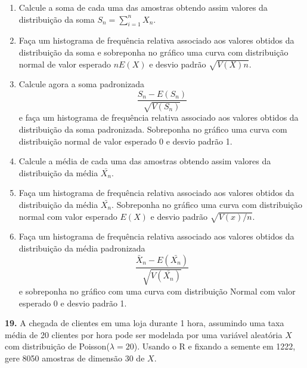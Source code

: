 \documentclass[
]{book}
\begin{document}
\begin{enumerate}
\def\labelenumi{(\alph{enumi})}
\item
  Calcule a soma de cada uma das amostras obtendo assim valores da
  distribuição da soma \(S_{n} = \sum_{i=1}^{n}X_{n}\).
\item
  Faça um histograma de frequência relativa associado aos valores
  obtidos da distribuição da soma e sobreponha no gráfico uma curva com
  distribuição normal de valor esperado \(nE(X)\) e desvio padrão
  \(\sqrt{V(X)n}\).
\item
  Calcule agora a soma padronizada
  \[\frac{S_{n}-E(S_{n})}{\sqrt{V(S_{n})}}\] e faça um histograma de
  frequência relativa associado aos valores obtidos da distribuição da
  soma padronizada. Sobreponha no gráfico uma curva com distribuição
  normal de valor esperado 0 e desvio padrão 1.
\item
  Calcule a média de cada uma das amostras obtendo assim valores
  da distribuição da média \(\bar{X_{n}}\).
\item
  Faça um histograma de frequência relativa associado aos valores
  obtidos da distribuição da média \(\bar{X_{n}}\). Sobreponha no gráfico
  uma curva com distribuição normal com valor esperado \(E(X)\) e desvio
  padrão \(\sqrt{V(x)/n}\).
\item
  Faça um histograma de frequência relativa associado aos valores
  obtidos da distribuição da média padronizada
  \[\frac{\bar{X}_{n}-E(\bar{X_{n}})}{\sqrt{V(\bar{X_{n}})}}\] e
  sobreponha no gráfico com uma curva com distribuição Normal com valor
  esperado 0 e desvio padrão 1.
\end{enumerate}

\textbf{19.} A chegada de clientes em uma loja durante 1 hora, assumindo uma
taxa média de 20 clientes por hora pode ser modelada por uma variável
aleatória \(X\) com distribuição de Poisson(\(\lambda=20\)). Usando o R e
fixando a semente em 1222, gere 8050 amostras de dimensão 30 de \(X\).
\end{document}
